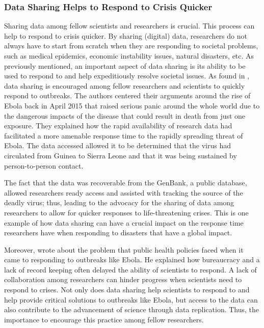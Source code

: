 \documentclass[sigconf]{acmart}
\begin{document}
\subsubsection{Data Sharing Helps to Respond to Crisis Quicker}

Sharing data among fellow scientists and researchers is crucial. This process can help to respond to crisis quicker. By sharing (digital) data, researchers do not always have to start from scratch when they are responding to societal problems, such as medical epidemics, economic instability issues, natural disasters, etc.  As previously mentioned, an important aspect of data sharing is its ability to be used to respond to and help expeditiously resolve societal issues. As found in  \cite{yozwiak2015data}, data sharing is encouraged among fellow researchers and scientists to quickly respond to outbreaks. The authors centered their arguments around the rise of Ebola back in April 2015 that raised serious panic around the whole world due to the dangerous impacts of the disease that could result in death from just one exposure. They explained how the rapid availability of research data had facilitated a more amenable response time to the rapidly spreading threat of Ebola. The data accessed allowed it to be determined that the virus had circulated from Guinea to Sierra Leone and that it was being sustained by person-to-person contact. 

The fact that the data was recoverable from the GenBank, a public database, allowed researchers ready access and assisted with tracking the source of the deadly virus; thus, leading to the advocacy for the sharing of data among researchers to allow for quicker responses to life-threatening crises. This is one example of how data sharing can have a crucial impact on the response time researchers have when responding to disasters that have a global impact.

Moreover, \cite{vogel2014delays} wrote about the problem that public health policies faced when it came to responding to outbreaks like Ebola. He explained how bureaucracy and a lack of record keeping often delayed the ability of scientists to respond. A lack of collaboration among researchers can hinder progress when scientists need to respond to crises. Not only does data sharing help scientists to respond to and help provide critical solutions to outbreaks like Ebola, but access to the data can also contribute to the advancement of science through data replication. Thus, the importance to encourage this practice among fellow researchers. 
\end{document}
